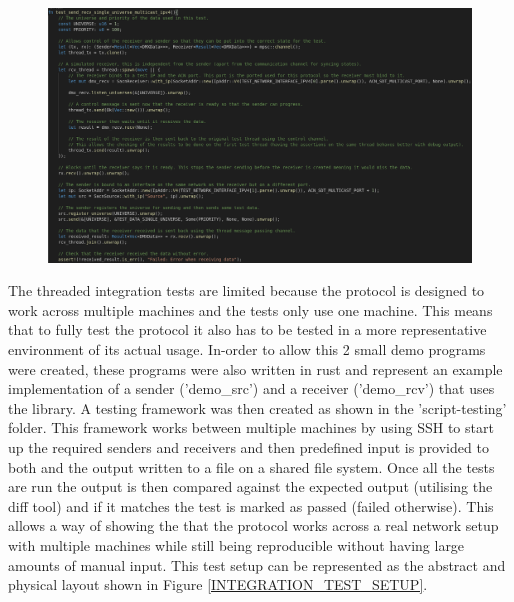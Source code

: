 \documentclass[11pt,a4paper]{article}
\begin{document}
\begin{figure}[H]
	\label{UNIT_INTEGRATION_TEST}
	\includegraphics[width=\textwidth]{integration-test-example.png}
	\caption{}
\end{figure}

The threaded integration tests are limited because the protocol is designed to work across multiple machines and the tests only use one machine. This means that to fully test the protocol it also has to be tested in a more representative environment of its actual usage. In-order to allow this 2 small demo programs were created, these programs were also written in rust and represent an example implementation of a sender ('demo\_src') and a receiver ('demo\_rcv') that uses the library. A testing framework was then created as shown in the 'script-testing' folder. This framework works between multiple machines by using SSH to start up the required senders and receivers and then predefined input is provided to both and the output written to a file on a shared file system. Once all the tests are run the output is then compared against the expected output (utilising the diff tool) and if it matches the test is marked as passed (failed otherwise). This allows a way of showing the that the protocol works across a real network setup with multiple machines while still being reproducible without having large amounts of manual input. This test setup can be represented as the abstract and physical layout shown in Figure \ref{INTEGRATION_TEST_SETUP}.
\end{document}
